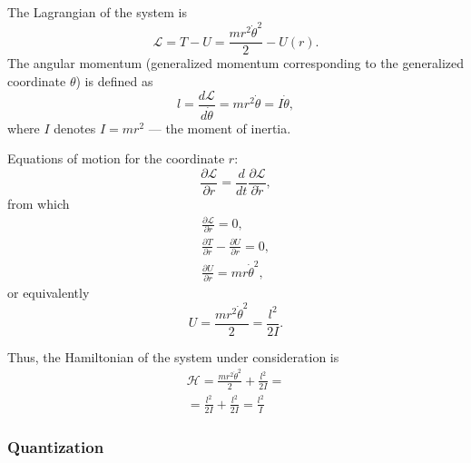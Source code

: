 The Lagrangian of the system is
\[
\mathcal{L} = T - U = \frac{m r^2 \dot{\theta}^2 }{2} - U\left( r \right).
\]
The angular momentum (generalized momentum corresponding to the generalized
coordinate $\theta$) is defined as
\begin{equation}
l = \frac{d \mathcal{L}}{d \dot{\theta}} = 
m r^2 \dot{\theta} = I \dot{\theta},
\label{eqAngualrMomentumClass}
\end{equation}
where $I$ denotes $I = m r^2$ — the moment of inertia.

Equations of motion for the coordinate $r$:
\[
\frac{ \partial \mathcal{L} }{\partial r} = 
\frac{d}{d t} \frac{\partial \mathcal{L}}{\partial \dot{r}},
\]
from which
\begin{eqnarray}
\frac{ \partial \mathcal{L} }{\partial r} = 0,
\nonumber \\
\frac{ \partial T }{\partial r} - \frac{ \partial U }{\partial r} = 0,
\nonumber \\
\frac{\partial U}{\partial r} = m r \dot{\theta}^2,
\nonumber
\end{eqnarray}
or equivalently
\[
 U = \frac{m r^2 \dot{\theta}^2}{2} = \frac{l^2}{2 I}.
\]
 
Thus, the Hamiltonian  of the system under consideration
is
\begin{eqnarray}
\mathcal{H} = \frac{m r^2 \dot{\theta}^2 }{2} + \frac{l^2}{2 I} = 
\nonumber \\
= \frac{l^2}{2 I} + \frac{l^2}{2 I} = \frac{l^2}{I}
\label{eqHClassical}
\end{eqnarray}

\subsubsection{Quantization}

